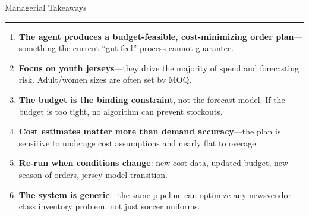 \documentclass[aspectratio=169, 9pt]{beamer}
\newcommand{\goldrule}{\textcolor{PurdueGold}{\rule{\linewidth}{1.2pt}}}
\begin{document}
\begin{frame}{Managerial Takeaways}
\goldrule
\vspace{4pt}
\begin{enumerate}[label={\color{AgedGold}\bfseries\arabic*.}, itemsep=5pt]\small
  \item \textbf{The agent produces a budget-feasible, cost-minimizing order plan}---something the current ``gut feel'' process cannot guarantee.

  \item \textbf{Focus on youth jerseys}---they drive the majority of spend and forecasting risk. Adult/women sizes are often set by MOQ.

  \item \textbf{The budget is the binding constraint}, not the forecast model. If the budget is too tight, no algorithm can prevent stockouts.

  \item \textbf{Cost estimates matter more than demand accuracy}---the plan is sensitive to underage cost assumptions and nearly flat to overage.

  \item \textbf{Re-run when conditions change}: new cost data, updated budget, new season of orders, jersey model transition.

  \item \textbf{The system is generic}---the same pipeline can optimize any newsvendor-class inventory problem, not just soccer uniforms.
\end{enumerate}
\end{frame}
\end{document}

